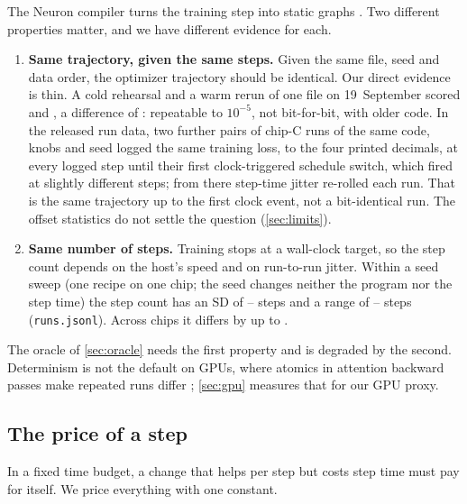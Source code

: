The Neuron compiler turns the training step into static graphs \citep{aws_neuron_docs}. Two different properties
matter, and we have different evidence for each.
\begin{enumerate}
  \item \textbf{Same trajectory, given the same steps.} Given the same file, seed and data order, the optimizer
    trajectory should be identical. Our direct evidence is thin. A cold rehearsal and a warm rerun of one file on
    19~September scored \docnum{} and \docnum{}, a difference of : repeatable
    to $10^{-5}$, not bit-for-bit, with older code. In the released run data, two further pairs of chip-C runs of
    the same code, knobs and seed logged the same training loss, to the four printed decimals, at every logged step
    until their first clock-triggered schedule switch, which fired at slightly different steps; from there
    step-time jitter re-rolled each run. That is the same trajectory up to the first clock event, not a bit-identical
    run. The offset statistics do not settle the question (\cref{sec:limits}).
  \item \textbf{Same number of steps.} Training stops at a wall-clock target, so the step count depends on the
    host's speed and on run-to-run jitter. Within a seed sweep (one recipe on one chip; the seed changes neither the
    program nor the step time) the step count has an SD of -- steps and a range
    of -- steps (\texttt{runs.jsonl}). Across chips it differs by up to
    \docnum{}.
\end{enumerate}
The oracle of \cref{sec:oracle} needs the first property and is degraded by the second. Determinism is not the
default on GPUs, where atomics in attention backward passes make repeated runs differ
\citep{pytorch_reproducibility,summers2021nondeterminism}; \cref{sec:gpu} measures that for our GPU proxy.

\subsection{The price of a step}
\label{sec:price}

In a fixed time budget, a change that helps per step but costs step time must pay for itself. We price everything
with one constant.

